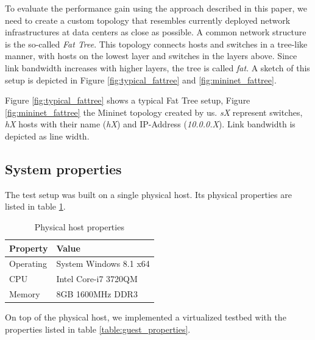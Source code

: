 To evaluate the performance gain using the approach described in this paper, we need to create a
custom topology that resembles currently deployed network infrastructures at data centers as close
as possible. A common network structure is the so-called \textit{Fat Tree}. \cite{datacenter} This
topology connects hosts and switches in a tree-like manner, with hosts on the lowest layer and
switches in the layers above. Since link bandwidth increases with higher layers, the tree is called
\textit{fat}. A sketch of this setup is depicted in Figure \ref{fig:typical_fattree} and
\ref{fig:mininet_fattree}.

Figure \ref{fig:typical_fattree} shows a typical Fat Tree setup, Figure \ref{fig:mininet_fattree}
the Mininet topology created by us. \textit{sX} represent switches, \textit{hX} hosts with their
name (\textit{hX}) and IP-Address (\textit{10.0.0.X}). Link bandwidth is depicted as line width.

\subsection{System properties}
The test setup was built on a single physical host. Its physical properties are listed in table
\ref{table:host_properties}.

\begin{table}[h]
    \centering
    \begin{tabular}{| l | l | }
        \hline
        \textbf{Property} & \textbf{Value} \\ \hline
        Operating &  System Windows 8.1 x64 \\ \hline
        CPU & Intel Core-i7 3720QM \\ \hline
        Memory & 8GB 1600MHz DDR3 \\ \hline
    \end{tabular}
    \caption{Physical host properties}
    \label{table:host_properties}
\end{table}

On top of the physical host, we implemented a virtualized testbed with the properties listed in
table \ref{table:guest_properties}.

